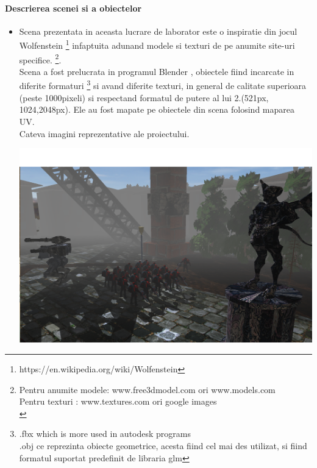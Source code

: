 \graphicspath{ {images/} }


\paragraph{Descrierea scenei si a obiectelor}

\begin{itemize}
\item
	\tab Scena prezentata in aceasta lucrare de laborator este o inspiratie din jocul Wolfenstein \footnote{https://en.wikipedia.org/wiki/Wolfenstein} infaptuita adunand modele si texturi de pe anumite site-uri specifice. \footnote{Pentru anumite modele: www.free3dmodel.com ori www.models.com\\ \tab Pentru texturi : www.textures.com ori google images\\}.\\
	\tab Scena a fost prelucrata in programul Blender , obiectele fiind incarcate in diferite formaturi \footnote{.fbx which is more used in autodesk programs\\\tab .obj ce reprezinta obiecte geometrice, acesta fiind cel mai des utilizat, si fiind formatul suportat predefinit de libraria glm} si avand diferite texturi, in general de calitate superioara (peste 1000pixeli) si respectand formatul de putere al lui 2.(521px, 1024,2048px). Ele au fost mapate pe obiectele din scena folosind maparea UV.\\
	\tab Cateva imagini reprezentative ale proiectului.\\

\begin{center}
  	\includegraphics[scale=0.4]{1}
\end{center}


\end{itemize}
